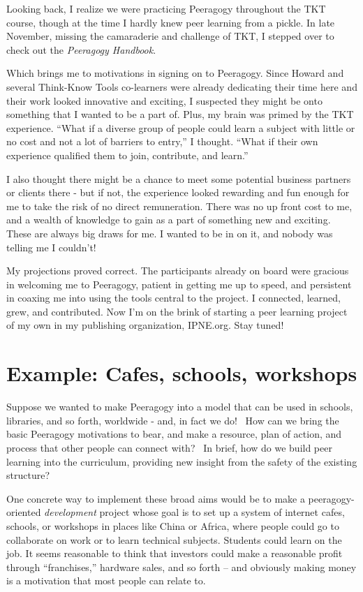 Looking back, I realize we were practicing Peeragogy throughout the TKT
course, though at the time I hardly knew peer learning from a pickle. In
late November, missing the camaraderie and challenge of TKT, I stepped
over to check out the \emph{Peeragogy Handbook}.

Which brings me to motivations in signing on to Peeragogy. Since Howard
and several Think-Know Tools co-learners were already dedicating their
time here and their work looked innovative and exciting, I suspected
they might be onto something that I wanted to be a part of. Plus, my
brain was primed by the TKT experience. ``What if a diverse group of
people could learn a subject with little or no cost and not a lot of
barriers to entry,'' I thought. ``What if their own experience qualified
them to join, contribute, and learn.''

I also thought there might be a chance to meet some potential business
partners or clients there - but if not, the experience looked rewarding
and fun enough for me to take the risk of no direct remuneration. There
was no up front cost to me, and a wealth of knowledge to gain as a part
of something new and exciting. These are always big draws for me. I
wanted to be in on it, and nobody was telling me I couldn't!

My projections proved correct. The participants already on board were
gracious in welcoming me to Peeragogy, patient in getting me up to
speed, and persistent in coaxing me into using the tools central to the
project. I connected, learned, grew, and contributed. Now I'm on the
brink of starting a peer learning project of my own in my publishing
organization, IPNE.org. Stay tuned!

\section*{Example: Cafes, schools,
workshops}\label{example-cafes-schools-workshops}

Suppose we wanted to make Peeragogy into a model that can be used in
schools, libraries, and so forth, worldwide - and, in fact we do! ~How
can we bring the basic Peeragogy motivations to bear, and make a
resource, plan of action, and process that other people can connect
with? ~In brief, how do we build peer learning into the curriculum,
providing new insight from the safety of the existing structure?

One concrete way to implement these broad aims would be to make a
peeragogy-oriented \emph{development} project whose goal is to set up a
system of internet cafes, schools, or workshops in places like China or
Africa, where people could go to collaborate on work or to learn
technical subjects. Students could learn on the job. It seems reasonable
to think that investors could make a reasonable profit through
``franchises,'' hardware sales, and so forth -- and obviously making
money is a motivation that most people can relate to.

